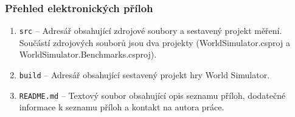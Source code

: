 \label{chap:attachments}

\subsubsection{Přehled elektronických příloh}

\begin{enumerate}
    \item \texttt{src} -- Adresář obsahující zdrojové soubory a sestavený projekt měření. Součástí zdrojových souborů jsou dva projekty (WorldSimulator.csproj a WorldSimulator.Benchmarks.csproj).

    \item \texttt{build} -- Adresář obsahující sestavený projekt hry World Simulator.

    \item \texttt{README.md} -- Textový soubor obsahující opis seznamu příloh, dodatečné informace k seznamu příloh a kontakt na autora práce.
\end{enumerate}